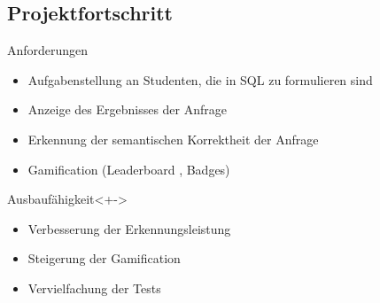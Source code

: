 \subsection{Projektfortschritt}

\begin{frame}{\insertsectionhead}{\insertsubsectionhead}
  \begin{block}{Anforderungen}
    \begin{itemize}
      \item Aufgabenstellung an Studenten, die in SQL zu formulieren sind \only<+->{\done}
      \item Anzeige des Ergebnisses der Anfrage \only<+->{\done}
      \item Erkennung der semantischen Korrektheit der Anfrage \only<+->{\done}
      \item Gamification (Leaderboard \only<+->{\done}, Badges) 
    \end{itemize}
  \end{block}

  \begin{block}{Ausbaufähigkeit}<+->
    \begin{itemize}
      \item Verbesserung der Erkennungsleistung
      \item Steigerung der Gamification
      \item Vervielfachung der Tests
    \end{itemize}
  \end{block}
\end{frame}

